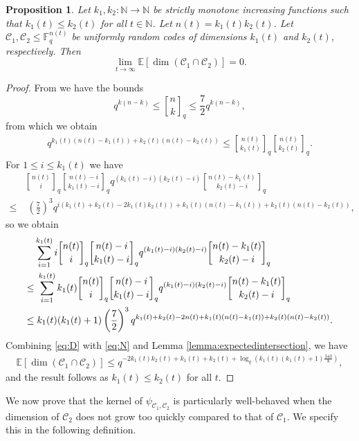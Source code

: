 \documentclass[a4paper,11pt,reqno]{article}
\newcommand{\F}{\mathbb{F}}
\newcommand{\E}{\mathbb E}
\newcommand{\C}{\mathcal{C}}
\newcommand{\qbinom}[2]{\genfrac[]{0pt}{0}{#1}{#2}}
\theoremstyle{plain} \numberwithin{equation}{section}
\newtheorem{proposition}[theorem]{Proposition}
\theoremstyle{definition}
\begin{document}
\begin{proposition}\label{prop:limitinter}
Let $k_1,k_2\colon \mathbb{N}\rightarrow \mathbb{N}$ be strictly monotone increasing functions such that $k_1(t)\leq k_2(t)$ for all $t\in \mathbb{N}$. Let $n(t)=k_1(t)k_2(t)$. Let $\C_1, \C_2 \leq \F_q^{n(t)}$ be uniformly random codes of dimensions $k_1(t)$ and $k_2(t)$, respectively. Then $$\lim_{t\rightarrow \infty} \E[\dim (\C_1\cap \C_2)] = 0.$$
\end{proposition}\begin{proof}
From \cite{ihringer2015} we have the bounds
\[
    q^{k(n-k)}\leq \qbinom{n}{k}_q \leq \frac{7}{2}q^{k(n-k)},
\]
from which we obtain
\begin{align}
q^{k_1(t)(n(t)-k_1(t))+k_2(t)(n(t)-k_2(t))} \leq \qbinom{n(t)}{k_1(t)}_q \qbinom{n(t)}{k_2(t)}_q. \label{eq:D}
\end{align}
For $1\leq i \leq k_1(t)$ we have
\begin{align*}
    &\qbinom{n(t)}{i}_q \qbinom{n(t)-i}{k_1(t)-i}_q q^{(k_1(t)-i)(k_2(t)-i)}\qbinom{n(t)-k_1(t)}{k_2(t)-i}_q \\
    \leq&\; \left( \frac{7}{2}\right)^3q^{i(k_1(t)+k_2(t)-2k_1(t)k_2(t)) + k_1(t)(n(t)-k_1(t)) + k_2(t)(n(t)-k_2(t))},
\end{align*}
so we obtain
\begin{align}
    &\sum^{k_1(t)}_{i=1} i \qbinom{n(t)}{i}_q \qbinom{n(t)-i}{k_1(t)-i}_q q^{(k_1(t)-i)(k_2(t)-i)}\qbinom{n(t)-k_1(t)}{k_2(t)-i}_q \notag \\
    \leq&\; \sum^{k_1(t)}_{i=1} k_1(t) \qbinom{n(t)}{i}_q \qbinom{n(t)-i}{k_1(t)-i}_q q^{(k_1(t)-i)(k_2(t)-i)}\qbinom{n(t)-k_1(t)}{k_2(t)-i}_q \notag\\
    \leq&\; k_1(t)(k_1(t)+1)\left(\frac{7}{2}\right)^3q^{k_1(t)+k_2(t)-2n(t) + k_1(t)(n(t)-k_1(t)) + k_2(t)(n(t)-k_2(t))}. \label{eq:N}
\end{align}
Combining \eqref{eq:D} with \eqref{eq:N} and Lemma \ref{lemma:expectedintersection}, we have
\begin{align*}
    \E[\dim (\C_1 \cap \C_2)] \leq q^{-2k_1(t)k_2(t) + k_1(t) + k_2(t) + \log_q\left( k_1(t)(k_1(t)+1)\frac{343}{8}\right)},
\end{align*}
and the result follows as $k_1(t) \leq k_2(t)$ for all $t$.
\end{proof}

We now prove that the kernel of $\psi_{\C_1,\C_2}$ is particularly well-behaved when the dimension of $\C_2$ does not grow too quickly compared to that of $\C_1$. We specify this in the following definition.
\end{document}
